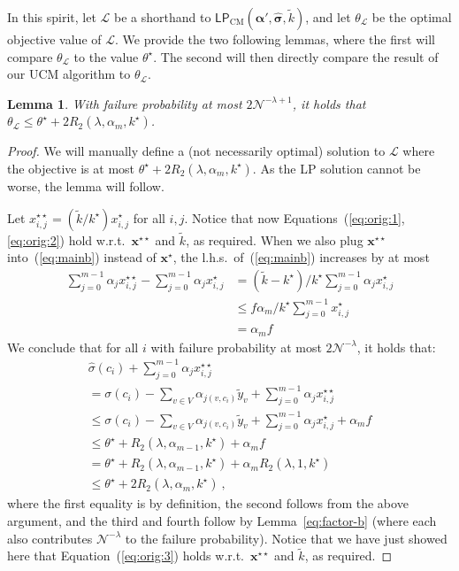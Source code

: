 \documentclass[letterpaper]{article} %
\newtheorem{lemma}[theorem]{Lemma}
\theoremstyle{definition}
\newcommand{\NN}{\mathcal{N}}
\newcommand{\LL}{\mathcal{L}}
\newcommand\vecc{\mathbf}
\newcommand\vecgreek{\bm}
\newcommand{\veca}{\vecgreek{\alpha}}
\newcommand{\LPCM}{\mathsf{LP}_{\mathrm{CM}}}
\begin{document}
In this spirit, let $\LL$ be a shorthand to $\LPCM(\veca', \vecgreek{\hat{\sigma}}, \tilde{k})$, and let $\theta_{\LL}$ be the optimal objective value of $\LL$. We provide the two following lemmas, where the first will compare  $\theta_{\LL}$ to the value $\theta^\star$. The second will then directly compare the result of our UCM algorithm to $\theta_{\LL}$.
\begin{lemma}\label{lem:double_star}
	With failure probability at most $2\NN^{-\lambda+1}$, it holds that $\theta_{\LL}\leq \theta^\star  +  2R_2(\lambda, \alpha_{m},k^\star)$.
\end{lemma}
\begin{proof}
	We will manually define a (not necessarily optimal) solution to $\LL$ where the objective is at most $\theta^\star  + 2R_2(\lambda, \alpha_{m},k^\star)$. As the LP solution cannot be worse, the lemma will follow.

	Let $x^{\star \star }_{i,j} = (\tilde{k}/k^\star )x^{\star }_{i,j}$ for all $i,j$. Notice that now Equations~(\ref{eq:orig:1},\ref{eq:orig:2}) hold w.r.t.\ $\vecc{x^{\star \star }}$ and $\tilde{k}$, as required. When we also  plug $\vecc{x^{\star \star }}$ into~(\ref{eq:mainb}) instead of $\vecc{x^{\star}}$, the l.h.s.\ of~(\ref{eq:mainb}) increases by at most
	\begin{align*}
		\sum_{j=0}^{m-1} \alpha_j x^{\star \star }_{i,j}-\sum_{j=0}^{m-1} \alpha_j  x^\star _{i,j} &= (\tilde{k}-k^\star )/k^\star   \sum_{j=0}^{m-1} \alpha_j  x^\star _{i,j}\\
		&\leq f\alpha_m /k^\star  \sum_{j=0}^{m-1} x^\star _{i,j}\\
		&=  \alpha_m f
	\end{align*}
	We conclude that for all $i$ with failure probability at most $2\NN^{-\lambda}$, it holds that:
	\begin{multline*}
	\hat{\sigma}(c_i)  + \sum_{j=0}^{m-1} \alpha_j x^{\star \star }_{i,j}\\
	= \sigma(c_i) - \sum_{v \in V}\alpha_{j(v,c_i)} \tilde{y}_{v} + \sum_{j=0}^{m-1}\alpha_j x^{\star \star }_{i,j} \\
	\leq \sigma(c_i) - \sum_{v \in V}\alpha_{j(v,c_i)} \tilde{y}_{v} + \sum_{j=0}^{m-1}\alpha_j x^{\star }_{i,j} + \alpha_m f\\
	\leq \theta^\star  +  R_2(\lambda, \alpha_{m-1},k^\star)+\alpha_m f \\
	=\theta^\star  +  R_2(\lambda, \alpha_{m-1},k^\star)+\alpha_m R_2(\lambda, 1,k^\star)\\
	\leq \theta^\star  +  2R_2(\lambda, \alpha_{m},k^\star)\ ,
	\end{multline*}
	where the first equality is by definition, the second follows from the above argument, and the third and fourth follow by Lemma~\ref{eq:factor-b} (where each also contributes $\NN^{-\lambda}$ to the failure probability). Notice that we have just showed here that Equation~(\ref{eq:orig:3}) holds w.r.t.\ $\vecc{x^{\star \star }}$ and $\tilde{k}$, as required.


\end{proof}
\end{document}
